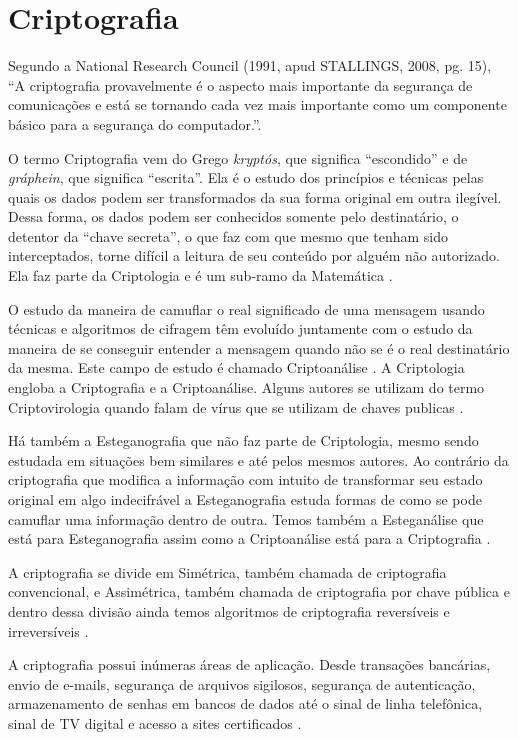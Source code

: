\section{Criptografia}
\label{sec:criptografia}
Segundo a National Research Council (1991, apud STALLINGS, 2008, pg. 15), “A criptografia provavelmente é o aspecto mais importante da segurança de comunicações e está se tornando cada vez mais importante como um componente básico para a segurança do computador.”.

O termo Criptografia vem do Grego \textit{kryptós}, que significa “escondido” e de \textit{gráphein}, que significa “escrita”. Ela é o estudo dos princípios e técnicas pelas quais os dados podem ser transformados da sua forma original em outra ilegível. Dessa forma, os dados podem ser conhecidos somente pelo destinatário, o detentor da “chave secreta”, o que faz com que mesmo que tenham sido interceptados, torne difícil a leitura de seu conteúdo por alguém não autorizado. Ela faz parte da Criptologia e é um sub-ramo da Matemática \cite{knudsen98}.

O estudo da maneira de camuflar o real significado de uma mensagem usando técnicas e algoritmos de cifragem têm evoluído juntamente com o estudo da maneira de se conseguir entender a mensagem quando não se é o real destinatário da mesma. Este campo de estudo é chamado Criptoanálise \cite{gaines56}. A Criptologia engloba a Criptografia e a Criptoanálise. Alguns autores se utilizam do termo Criptovirologia quando falam de vírus que se utilizam de chaves publicas \cite{young04}.

Há também a Esteganografia que não faz parte de Criptologia, mesmo sendo estudada em situações bem similares e até pelos mesmos autores. Ao contrário da criptografia que modifica a informação com intuito de transformar seu estado original em algo indecifrável a Esteganografia estuda formas de como se pode camuflar uma informação dentro de outra. Temos também a Esteganálise que está para Esteganografia assim como a Criptoanálise está para a Criptografia \cite{salomon05}.

A criptografia se divide em Simétrica, também chamada de criptografia convencional, e Assimétrica, também chamada de criptografia por chave pública \cite{stallings14} e dentro dessa divisão ainda temos algoritmos de criptografia reversíveis e irreversíveis \cite{stallings14} \cite{itu91}.

A criptografia possui inúmeras áreas de aplicação. Desde transações bancárias, envio de e-mails, segurança de arquivos sigilosos, segurança de autenticação, armazenamento de senhas em bancos de dados até o sinal de linha telefônica, sinal de TV digital e acesso a sites certificados \cite{avelino07}.


